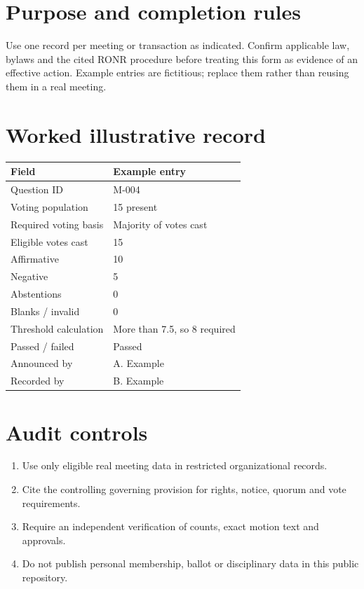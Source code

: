 \documentclass[11pt]{article}
\begin{document}
\SuiteOpen
\section{Purpose and completion rules}
Use one record per meeting or transaction as indicated. Confirm applicable law, bylaws and the cited RONR procedure before treating this form as evidence of an effective action. Example entries are fictitious; replace them rather than reusing them in a real meeting.

\section{Worked illustrative record}
\begin{longtable}{@{}p{.38\linewidth}p{.55\linewidth}@{}}\toprule Field & Example entry\\\midrule\endhead


Question ID & M-004\\
Voting population & 15 present\\
Required voting basis & Majority of votes cast\\
Eligible votes cast & 15\\
Affirmative & 10\\
Negative & 5\\
Abstentions & 0\\
Blanks / invalid & 0\\
Threshold calculation & More than 7.5, so 8 required\\
Passed / failed & Passed\\
Announced by & A. Example\\
Recorded by & B. Example\\
\bottomrule\end{longtable}
\section{Audit controls}
\begin{enumerate}[leftmargin=*,itemsep=4pt]
\item Use only eligible real meeting data in restricted organizational records.
\item Cite the controlling governing provision for rights, notice, quorum and vote requirements.
\item Require an independent verification of counts, exact motion text and approvals.
\item Do not publish personal membership, ballot or disciplinary data in this public repository.
\end{enumerate}
\end{document}

